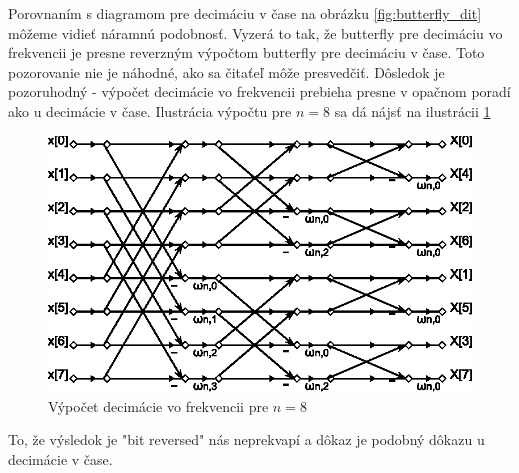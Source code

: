 Porovnaním s diagramom pre decimáciu v čase na obrázku
\ref{fig:butterfly_dit} môžeme
vidieť náramnú podobnosť. Vyzerá to tak, že butterfly pre decimáciu vo
frekvencii
je presne reverzným výpočtom butterfly pre decimáciu v čase. Toto
pozorovanie nie je náhodné, ako sa čitaťeľ môže presvedčiť. Dôsledok
je pozoruhodný - výpočet decimácie vo frekvencii 
prebieha presne v opačnom poradí
ako u decimácie v čase. Ilustrácia výpočtu pre $n=8$ sa dá nájsť na
ilustrácii \ref{fig:dif}

\begin{figure}[htp]
    \centering
        \includegraphics{obrazky/algoritmy/dif}
        \caption{Výpočet decimácie vo frekvencii pre $n=8$}
    \label{fig:dif}
\end{figure}
To, že výsledok je "bit reversed" nás neprekvapí a dôkaz je podobný
dôkazu u decimácie v čase.


